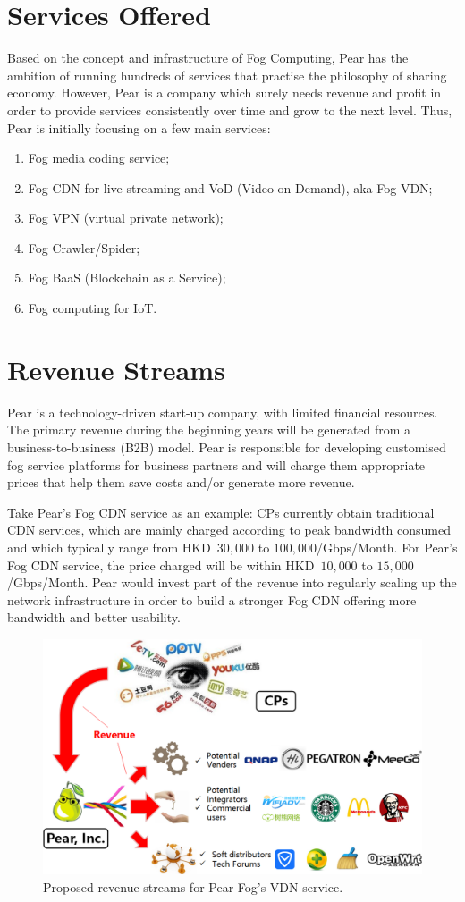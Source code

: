 \section{Services Offered}
Based on the concept and infrastructure of Fog Computing, Pear has the ambition of running hundreds of services that practise the philosophy of sharing economy. However, Pear is a company which surely needs revenue and profit in order to provide services consistently over time and grow to the next level. Thus, Pear is initially focusing on a few main services: 
\begin{enumerate}
	\item Fog media coding service;
	\item Fog CDN for live streaming and VoD (Video on Demand), aka Fog VDN;
	\item Fog VPN (virtual private network);
	\item Fog Crawler/Spider;
	\item Fog BaaS (Blockchain as a Service);
	\item Fog computing for IoT.
\end{enumerate}

\section{Revenue Streams}
Pear is a technology-driven start-up company, with limited financial resources. The primary revenue during the beginning years will be generated from a business-to-business (B2B) model. Pear is responsible for developing customised fog service platforms for business partners and will charge them appropriate prices that help them save costs and/or generate more revenue. 

Take Pear's Fog CDN service as an example: CPs currently obtain traditional CDN services, which are mainly charged according to peak bandwidth consumed and which typically range from HKD~$30,000$ to $100,000$/Gbps/Month. For Pear's Fog CDN service, the price charged will be within HKD~$10,000$ to $15,000$/Gbps/Month. Pear would invest part of the revenue into regularly scaling up the network infrastructure in order to build a stronger Fog CDN offering more bandwidth and better usability. 

\begin{figure}[ht]
	\centering
	\includegraphics[width=.80\textwidth]{fig/biz/revenue_stream.png}
	\caption{Proposed revenue streams for Pear Fog's VDN service.} \label{fig:vdn-revenue-stream}
\end{figure}

